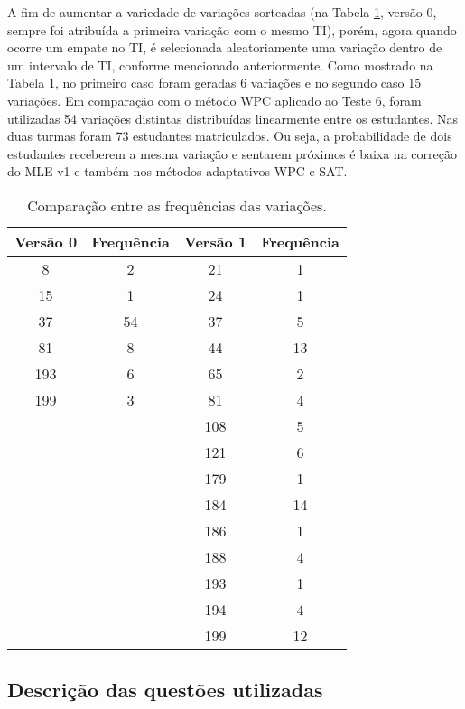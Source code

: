 A fim de aumentar a variedade de variações sorteadas (na Tabela \ref{tab:MLE_frequencias}, versão 0, sempre foi atribuída a primeira variação com o mesmo TI), porém, agora quando ocorre um empate no TI, é selecionada aleatoriamente uma variação dentro de um intervalo de TI, conforme mencionado anteriormente. Como mostrado na Tabela \ref{tab:MLE_frequencias}, no primeiro caso foram geradas 6 variações e no segundo caso 15 variações. Em comparação com o método WPC aplicado ao Teste 6, foram utilizadas 54 variações distintas distribuídas linearmente entre os estudantes. Nas duas turmas foram 73 estudantes matriculados. Ou seja, a probabilidade de dois estudantes receberem a mesma variação e sentarem próximos é baixa na correção do MLE-v1 e também nos métodos adaptativos WPC e SAT.

\begin{table}[!ht]
    \centering
    \caption{Comparação entre as frequências das variações.}
    \label{tab:MLE_frequencias}
    \begin{tabular}{|c|c|c|c|}
        \hline
        \cellcolor{green!25} \textbf{Versão 0} & \cellcolor{green!25} \textbf{Frequência} & \cellcolor{yellow!25} \textbf{Versão 1} & \cellcolor{yellow!25} \textbf{Frequência} \\
        \hline
        8 & 2 & 21 & 1 \\
        15 & 1 & 24 & 1 \\
        37 & 54 & 37 & 5 \\
        81 & 8 & 44 & 13 \\
        193 & 6 & 65 & 2 \\
        199 & 3 & 81 & 4 \\
        & & 108 & 5 \\
        & & 121 & 6 \\
        & & 179 & 1 \\
        & & 184 & 14 \\
        & & 186 & 1 \\
        & & 188 & 4 \\
        & & 193 & 1 \\
        & & 194 & 4 \\
        & & 199 & 12 \\
        \hline
    \end{tabular}
\end{table}

\subsection{Descrição das questões utilizadas}\label{sec:questoesTeste6}

